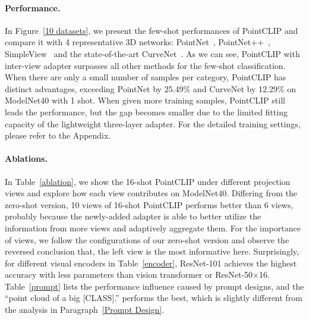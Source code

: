 \documentclass[10pt,twocolumn,letterpaper]{article}
\begin{document}
\paragraph{Performance.} In Figure~\ref{10 datasets}, we present the few-shot performances of PointCLIP and compare it with 4 representative 3D networks: PointNet~\cite{qi2017pointnet}, PointNet++~\cite{qi2017pointnet++}, SimpleView~\cite{goyal2021revisiting} and the state-of-the-art CurveNet~\cite{muzahid2020curvenet}. As we can see, PointCLIP with inter-view adapter surpasses all other methods for the few-shot classification. When there are only a small number of samples per category, PointCLIP has distinct advantages, exceeding PointNet by 25.49$\%$ and CurveNet by 12.29$\%$ on ModelNet40 with 1 shot. When given more training samples, PointCLIP still leads the performance, but the gap becomes smaller due to the limited fitting capacity of the lightweight three-layer adapter. For the detailed training settings, please refer to the Appendix.

\vspace*{-8pt}
\paragraph{Ablations.}
\label{abfew}
In Table~\ref{ablation}, we show the 16-shot PointCLIP under different projection views and explore how each view contributes on ModelNet40. Differing from the zero-shot version, 10 views of 16-shot PointCLIP performs better than 6 views, probably because the newly-added adapter is able to better utilize the information from more views and adaptively aggregate them. For the importance of views, we follow the configurations of our zero-shot version and observe the reversed conclusion that, the left view is the most informative here. Surprisingly, for different visual encoders in Table~\ref{encoder}, ResNet-101 achieves the highest accuracy with less parameters than vision transformer or ResNet-50$\times$16. Table~\ref{prompt} lists the performance influence caused by prompt designs, and the ``point cloud of a big [CLASS].'' performs the best, which is slightly different from the analysis in Paragraph~\ref{Prompt Design}.
\end{document}
